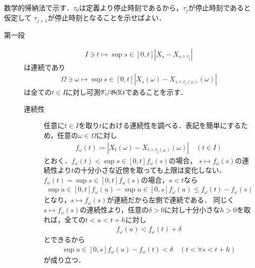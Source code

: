 	\begin{prf}
		数学的帰納法で示す．$\tau_0$は定義より停止時刻であるから，$\tau_j$が停止時刻であると仮定して
		$\tau_{j+1}$が停止時刻となることを示せばよい．
		\begin{description}
			\item[第一段]
				\begin{align}
					I \ni t \longmapsto \sup{s \in [0,t]}{\left| X_s - X_{s \wedge \tau_j} \right|}
				\end{align}
				は連続であり
				\begin{align}
					\Omega \ni \omega \longmapsto \sup{s \in [0,t]}{\left| X_s(\omega) - X_{s \wedge \tau_j(\omega)}(\omega) \right|}
				\end{align}
				は全ての$t \in I$に対し可測$\mathcal{F}_t/\mathfrak{B}(\mathbb{R})$であることを示す．
				\begin{description}
					\item[連続性]
						任意に$t \in I$を取り$t$における連続性を調べる．表記を簡単にするため，任意の$\omega \in \Omega$に対し
						\begin{align}
							f_\omega(t) \coloneqq \left| X_t(\omega) - X_{t \wedge \tau_j(\omega)}(\omega) \right| \quad (t \in I)
						\end{align}
						とおく．$f_\omega(t) < \sup{s \in [0,t]}{ f_\omega(s) }$の場合，
						$s \longmapsto f_\omega(s)$の連続性より$t$の十分小さな近傍を取っても上限は変化しない．
						$f_\omega(t) = \sup{s \in [0,t]}{f_\omega(s)}$の場合，$s < t$なら
						\begin{align}
							\sup{u \in [0,t]}{f_\omega(u)} - \sup{u \in [0,s]}{f_\omega(u)} \leq f_\omega(t) - f_\omega(s)
						\end{align}
						となり，$s \longmapsto f_\omega(s)$が連続だから左側で連続である．
						同じく$s \longmapsto f_\omega(s)$の連続性より，任意の$\delta > 0$に対し十分小さな$h > 0$を取れば，全ての$t < u < t + h$に対し
						\begin{align}
							f_\omega(u) < f_\omega(t) + \delta
						\end{align}
						とできるから　
						\begin{align}
							\sup{u \in [0,s]}{f_\omega(u)} - f_\omega(t) < \delta \quad (t < \forall s < t + h)
						\end{align}
						が成り立つ．
						

\end{description}
\end{description}
\end{prf}
